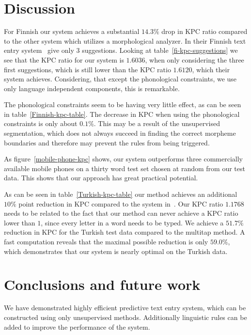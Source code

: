 \documentclass{llncs}
\begin{document}
\section{Discussion}\label{discussion}

For Finnish our system achieves a substantial $14.3\%$ drop in KPC
ratio compared to the other system which utilizes a morphological
analyzer. In their Finnish text entry
system~\cite{silfverberg/2011/cla} give only $3$ suggestions. Looking
at table~\ref{fi-kpc-suggestions} we see that the KPC ratio for our
system is $1.6036$, when only considering the three first suggestions,
which is still lower than the KPC ratio $1.6120$, which their system
achieves. Considering, that except the phonological constraints, we
use only language independent components, this is remarkable.

The phonological constraints seem to be having very little effect, as
can be seen in table~\ref{Finnish-kpc-table}. The decrease in KPC when
using the phonological constraints is only about $0.1\%$. This may be
a result of the unsupervised segmentation, which does not always
succeed in finding the correct morpheme boundaries and therefore may
prevent the rules from being triggered.

As figure~\ref{mobile-phone-kpc} shows, our system outperforms three
commercially available mobile phones on a thirty word test set chosen
at random from our test data. This shows that our approach has great
practical potential.

As can be seen in table~\ref{Turkish-kpc-table} our method achieves an
additional $10\%$ point reduction in KPC compared to the system
in~\cite{Tantug:2010}. Our KPC ratio $1.1768$ needs to be related to
the fact that our method can never achieve a KPC ratio lower than $1$,
since every letter in a word needs to be typed. We achieve a $51.7\%$
reduction in KPC for the Turkish test data compared to the multitap
method. A fast computation reveals that the maximal possible reduction
is only $59.0\%$, which demonstrates that our system is nearly optimal
on the Turkish data.

\section{Conclusions and future work}\label{conclusion}

We have demonstrated highly efficient predictive text entry system,
which can be constructed using only unsupervised methods. Additionally
linguistic rules can be added to improve the performance of the
system. 
\end{document}
